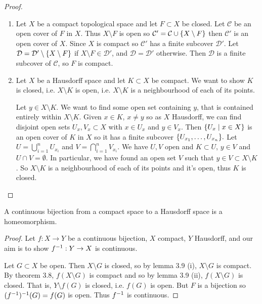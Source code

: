 \begin{proof}
    \begin{enumerate}
        \item Let $X$ be a compact topological space and let $F\subset X$ be closed. Let $\mathcal{C}$ be an open cover of $F$ in $X$. Thus $X \setminus F$ is open so $\mathcal{C}' = \mathcal{C} \cup \{X \setminus F\}$ then $\mathcal{C}'$ is an open cover of $X$. Since $X$ is compact so $\mathcal{C}'$ has a finite subcover $\mathcal{D}'$. Let $\mathcal{D} = \mathcal{D}' \setminus \{X \setminus F\}$ if $X \setminus F \in \mathcal{D}'$, and $\mathcal{D} = \mathcal{D}'$ otherwise. Then $\mathcal{D}$ is a finite subcover of $\mathcal{C}$, so $F$ is compact.
        
        \item Let $X$ be a Hausdorff space and let $K\subset X$ be compact. We want to show $K$ is closed, i.e. $X \setminus K$ is open, i.e. $X \setminus K$ is a neighbourhood of each of its points.
        
        Let $y\in X \setminus K$. We want to find some open set containing $y$, that is contained entirely within $X \setminus K$. Given $x\in K$, $x\neq y$ so as $X$ Hausdorff, we can find disjoint open sets $U_x, V_x\subset X$ with $x\in U_x$ and $y\in V_x$. Then $\{U_x\mid x\in X\}$ is an open cover of $K$ in $X$ so it has a finite subcover $\{U_{x_1}, \dots, U_{x_n}\}.$ 
        Let $U = \bigcup_{i=1}^n U_{x_i}$ and $V = \bigcap_{i=1}^n V_{x_i}$. We have $U,V$ open and $K\subset U$, $y\in V$ and $U\cap V = \emptyset$. In particular, we have found an open set $V$ such that $y\in V\subset X \setminus K$. So $X \setminus K$ is a neighbourhood of each of its points and it's open, thus $K$ is closed.
\end{enumerate}
\end{proof}

\begin{theorem}                     %
A continuous bijection from a compact space to a Hausdorff space is a homeomorphism.
\end{theorem}   

\begin{proof}
    Let $f: X \to Y$ be a continuous bijection, $X$ compact, $Y$ Hausdorff, and our aim is to show $f^{-1} : Y \to X$ is continuous.

    Let $G\subset X$ be open. Then $X \setminus G$ is closed, so by lemma 3.9 (i), $X \setminus G$ is compact. By theorem 3.8, $f(X \setminus G)$ is compact and so by lemma 3.9 (ii), $f(X \setminus G)$ is closed. That is, $Y \setminus f(G)$ is closed, i.e. $f(G)$ is open. But $F$ is a bijection so $(f^{-1})^{-1} (G) = f(G)$ is open. Thus $f^{-1}$ is continuous.
\end{proof}


